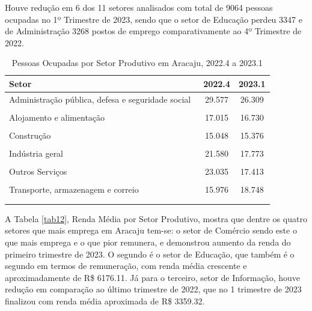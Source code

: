 \documentclass[
  12pt,
  a4paper,
]{article}
\begin{document}
Houve redução em 6 dos 11 setores analisados com total de 9064 pessoas
ocupadas no 1º Trimestre de 2023, sendo que o setor de Educação perdeu
3347 e de Administração 3268 postos de emprego comparativamente ao 4º
Trimestre de 2022.

\begingroup\fontsize{9}{11}\selectfont

\begin{longtable}[t]{>{\raggedright\arraybackslash}p{13cm}cc}
\caption{\label{tab:tab11}\label{tab11}Pessoas Ocupadas por Setor Produtivo em Aracaju, 2022.4 a 2023.1}\\
\toprule
Setor & 2022.4 & 2023.1\\
\midrule
Administração pública, defesa e seguridade social  & 29.577 & 26.309\\
\cellcolor[HTML]{DCDCDC}{Agricultura, pecuária, produção florestal, pesca e aquicultura} & \cellcolor[HTML]{DCDCDC}{1.452} & \cellcolor[HTML]{DCDCDC}{734}\\
Alojamento e alimentação  & 17.015 & 16.730\\
\cellcolor[HTML]{DCDCDC}{Comércio, reparação de veículos automotores e motocicletas} & \cellcolor[HTML]{DCDCDC}{66.814} & \cellcolor[HTML]{DCDCDC}{67.780}\\
Construção & 15.048 & 15.376\\
\addlinespace
\cellcolor[HTML]{DCDCDC}{Educação, saúde humana e serviços sociais} & \cellcolor[HTML]{DCDCDC}{62.700} & \cellcolor[HTML]{DCDCDC}{59.353}\\
Indústria geral & 21.580 & 17.773\\
\cellcolor[HTML]{DCDCDC}{Informação, comunicação e atividades financeiras, imobiliárias, profissionais e administrativas} & \cellcolor[HTML]{DCDCDC}{44.676} & \cellcolor[HTML]{DCDCDC}{46.710}\\
Outros Serviços & 23.035 & 17.413\\
\cellcolor[HTML]{DCDCDC}{Serviços domésticos} & \cellcolor[HTML]{DCDCDC}{12.283} & \cellcolor[HTML]{DCDCDC}{14.166}\\
\addlinespace
Transporte, armazenagem e correio  & 15.976 & 18.748\\
\bottomrule
\multicolumn{3}{l}{\rule{0pt}{1em}\textit{Fonte: IBGE (2023).}}\\
\multicolumn{3}{l}{\rule{0pt}{1em}}\\
\end{longtable}
\endgroup{}

A Tabela \ref{tab12}, Renda Média por Setor Produtivo, mostra que dentre
os quatro setores que mais emprega em Aracaju tem-se: o setor de
Comércio sendo este o que mais emprega e o que pior remunera, e
demonstrou aumento da renda do primeiro trimestre de 2023. O segundo é o
setor de Educação, que também é o segundo em termos de remuneração, com
renda média crescente e aproximadamente de R\$ 6176.11. Já para o
terceiro, setor de Informação, houve redução em comparação ao último
trimestre de 2022, que no 1 trimestre de 2023 finalizou com renda média
aproximada de R\$ 3359.32.
\end{document}
